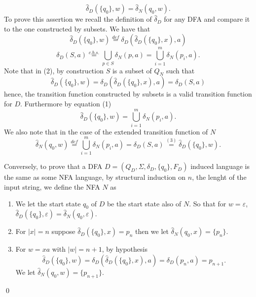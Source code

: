 \documentclass{article}
\newcommand{\D}{
    \hat{\delta}_{D}
}
\newcommand{\DD}[2]{
    \hat{\delta}_{D}(\{#1\}, #2)
}
\newcommand{\NN}[2]{
    \hat{\delta}_{N}(#1, #2)
}
\theoremstyle{remark}
\begin{document}
\begin{enumerate}
\begin{enumerate}
        \[
        \DD{q_0}{w} = \NN{q_0}{w}.
        \]
        To prove this assertion we recall the definition of $\D$ for any DFA and compare it to the one constructed by subsets.
        We have that 
        \begin{equation}
            \DD{q_0}{w} \stackrel{def}{=} \delta_D(\DD{q_0}{x},a)
        \end{equation}
        \begin{equation}
            \delta_D(S,a) \stackrel{c.b.s.}{=} \bigcup_{p \in S}\delta_N(p,a) = \bigcup_{i=1}^{m}\delta_N(p_i,a).
        \end{equation}
        Note that in (2), by construction $S$ is a subset of $Q_N$ such that
        \begin{equation}
            \DD{q_0}{w} = \delta_D(\DD{q_0}{x},a) = \delta_D(S,a)
        \end{equation}
        hence, the transition function constructed by subsets is a valid transition function for $D$.
        Furthermore by equation (1)
        \[
        \DD{q_0}{w} = \bigcup_{i=1}^{m}\delta_N(p_i,a).
        \]
        We also note that in the case of the extended transition function of $N$ 
        \[
        \NN{q_0}{w} \stackrel{def}{=} \bigcup_{i=1}^{m}\delta_N(p_i,a) = \delta_D(S,a) \stackrel{(3)}{=} \DD{q_0}{w}.
        \]
    \end{enumerate}
    Conversely, to prove that a DFA $D = (Q_D, \Sigma, \delta_D, \{q_0\}, F_D)$ induced language is the same as some NFA language, 
    by structural induction on $n$, the lenght of the input string, we define the NFA $N$ as 
    \begin{enumerate}
        \item[\textbf{Basis.}]
        We let the start state $q_0$ of $D$ be the start state also of $N$. 
        So that for $w = \varepsilon$, $\DD{q_0}{\varepsilon} = \NN{q_0}{\varepsilon}$.
        \item[\textbf{Hypothesis.}]
        For $\vert x \vert = n$ suppose $\DD{q_0}{x} = p_n$ then we let $\NN{q_0}{x} = \{p_n\}$.
        \item[\textbf{Thesis.}]
        For $w = xa$ with $\vert w \vert = n+1$, by hypothesis 
        \[
        \DD{q_0}{w} = \delta_D(\DD{q_0}{x},a) = \delta_D(p_n,a) = p_{n+1}.
        \]
        We let $\NN{q_0}{w} = \{p_{n+1}\}$.
    \end{enumerate}
    \begin{flushright}
        \qed
    \end{flushright}


\end{enumerate}
\end{document}
